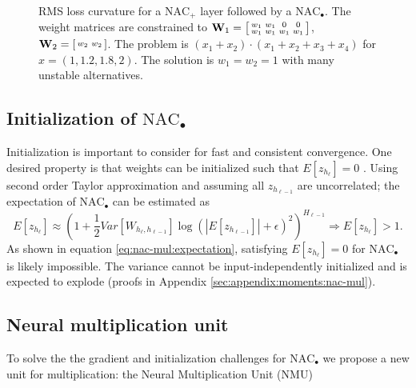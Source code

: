 \begin{figure}[h]
\caption{RMS loss curvature for a $\mathrm{NAC}_{+}$ layer followed by a $\mathrm{NAC}_{\bullet}$. The weight matrices are constrained to $\mathbf{W}_1 = \left[\protect\begin{smallmatrix}
w_1 & w_1 & 0 & 0 \\
w_1 & w_1 & w_1 & w_1
\protect\end{smallmatrix}\right]$, $\mathbf{W}_2 = \left[\protect\begin{smallmatrix}
w_2 & w_2
\protect\end{smallmatrix}\right]$. The problem is $(x_1 + x_2) \cdot (x_1 + x_2 + x_3 + x_4)$ for $x = \left(1, 1.2, 1.8, 2\right)$.
The solution is $w_1 = w_2 = 1$ with many unstable alternatives.}
\label{fig:nac-mul-eps-issue}
\end{figure}

\subsection{Initialization of \texorpdfstring{$\mathrm{NAC}_{\bullet}$}{NAC-mul}}
Initialization is important to consider for fast and consistent convergence.
One desired property is that weights can be initialized such that $E[z_{h_\ell}] = 0$ \cite{glorot-initialization}. Using second order Taylor approximation and assuming all $z_{h_{\ell-1}}$ are uncorrelated; the expectation of $\mathrm{NAC}_{\bullet}$ can be estimated as
\begin{equation}
E[z_{h_\ell}] \approx \left(1 + \frac{1}{2} Var[W_{h_\ell, h_{\ell-1}}] \log(|E[z_{h_{\ell-1}}]| + \epsilon)^2\right)^{H_{\ell-1}} \Rightarrow E[z_{h_\ell}] > 1.
\label{eq:nac-mul:expectation}
\end{equation}
As shown in equation \ref{eq:nac-mul:expectation}, satisfying $E[z_{h_\ell}] = 0$ for $\mathrm{NAC}_{\bullet}$ is likely impossible. The variance cannot be input-independently initialized and is expected to explode (proofs in Appendix \ref{sec:appendix:moments:nac-mul}).

\subsection{Neural multiplication unit}
To solve the the gradient and initialization challenges for $\mathrm{NAC}_{\bullet}$ we propose a new unit for multiplication: the Neural Multiplication Unit (NMU)


